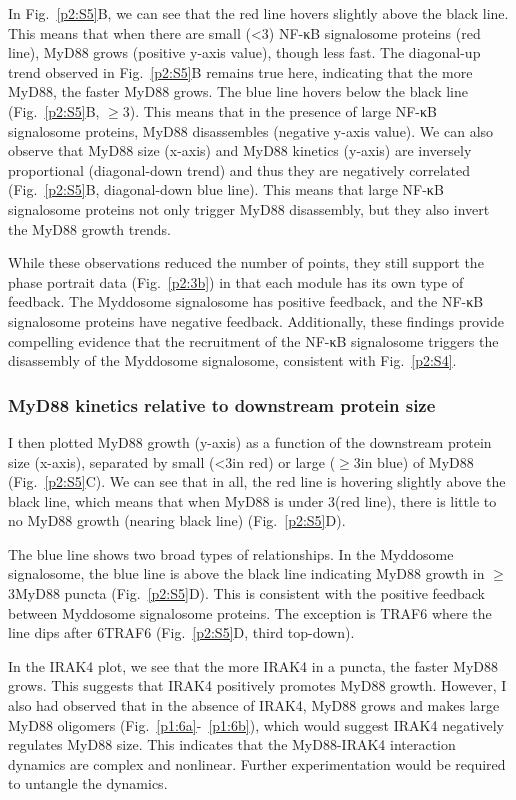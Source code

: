 In Fig.~\ref{p2:S5}B, we can see that the red line hovers slightly above the black line. This means that when there are small (<3\times) NF-κB signalosome proteins (red line), MyD88 grows (positive y-axis value), though less fast. The diagonal-up trend observed in Fig.~\ref{p2:S5}B remains true here, indicating that the more MyD88, the faster MyD88 grows. The blue line hovers below the black line (Fig.~\ref{p2:S5}B, $\geq$3\times). This means that in the presence of large NF-κB signalosome proteins, MyD88 disassembles (negative y-axis value). We can also observe that MyD88 size (x-axis) and MyD88 kinetics (y-axis) are inversely proportional (diagonal-down trend) and thus they are negatively correlated (Fig.~\ref{p2:S5}B, diagonal-down blue line). This means that large NF-κB signalosome proteins not only trigger MyD88 disassembly, but they also invert the MyD88 growth trends.

While these observations reduced the number of points, they still support the phase portrait data (Fig.~\ref{p2:3b}) in that each module has its own type of feedback. The Myddosome signalosome has positive feedback, and the NF-κB signalosome proteins have negative feedback. Additionally, these findings provide compelling evidence that the recruitment of the NF-κB signalosome triggers the disassembly of the Myddosome signalosome, consistent with Fig.~\ref{p2:S4}.

\subsubsection{MyD88 kinetics relative to downstream protein size}
I then plotted MyD88 growth (y-axis) as a function of the downstream protein size (x-axis), separated by small (<3\times in red) or large ($\geq$3\times in blue) of MyD88 (Fig.~\ref{p2:S5}C). We can see that in all, the red line is hovering slightly above the black line, which means that when MyD88 is under 3\times (red line), there is little to no MyD88 growth (nearing black line) (Fig.~\ref{p2:S5}D).

The blue line shows two broad types of relationships. In the Myddosome signalosome, the blue line is above the black line indicating MyD88 growth in $\geq$3\times MyD88 puncta (Fig.~\ref{p2:S5}D). This is consistent with the positive feedback between Myddosome signalosome proteins. The exception is TRAF6 where the line dips after 6\times TRAF6 (Fig.~\ref{p2:S5}D, third top-down).

In the IRAK4 plot, we see that the more IRAK4 in a puncta, the faster MyD88 grows. This suggests that IRAK4 positively promotes MyD88 growth. However, I also had observed that in the absence of IRAK4, MyD88 grows and makes large MyD88 oligomers (Fig.~\ref{p1:6a}-~\ref{p1:6b}), which would suggest IRAK4 negatively regulates MyD88 size. This indicates that the MyD88-IRAK4 interaction dynamics are complex and nonlinear. Further experimentation would be required to untangle the dynamics.

